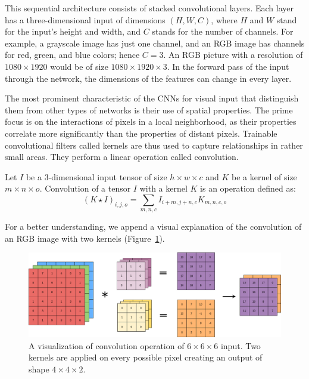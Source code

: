 This sequential architecture consists of stacked convolutional layers. Each layer has a three-dimensional input of dimensions $(H, W, C)$, where $H$ and $W$ stand for the input’s height and width, and $C$ stands for the number of channels. For example, a grayscale image has just one channel, and an RGB image has channels for red, green, and blue colors; hence $C = 3$. An RGB picture with a resolution of $1080 \times 1920$ would be of size $1080 \times 1920 \times 3$. In the forward pass of the input through the network, the dimensions of the features can change in every layer. 

The most prominent characteristic of the CNNs for visual input that distinguish them from other types of networks is their use of spatial properties. The prime focus is on the interactions of pixels in a local neighborhood, as their properties correlate more significantly than the properties of distant pixels. Trainable convolutional filters called kernels are thus used to capture relationships in rather small areas. They perform a linear operation called convolution.

\begin{defn}[Convolution]\label{def01:7}
	Let $I$ be a 3-dimensional input tensor of size $h \times w \times c$ and $K$ be a kernel of size $m \times n \times o$. Convolution of a tensor $I$ with a kernel $K$ is an operation defined as:
	\begin{equation}
		(K \star I)_{i, j, o} = \sum_{m, n, c} I_{i+m, j+n, c} K_{m, n, c, o}
	\end{equation}
\end{defn}

For a better understanding, we append a visual explanation of the convolution of an RGB image with two kernels (Figure~\ref{img02:conv}).

\begin{figure}[h]\centering
	\includegraphics[width=140mm]{../img/convolution.png}
	\caption{A visualization of convolution operation of $6\times6\times6$ input. Two kernels are applied on every possible pixel creating an output of shape $4\times4\times2$.}
	\label{img02:conv}
\end{figure}

